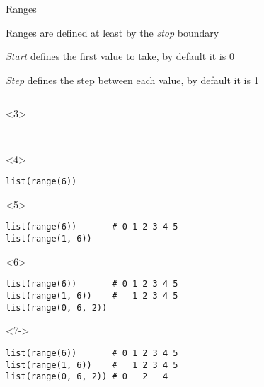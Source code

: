 \begin{frame}[fragile]{Ranges}

   Ranges are defined at least by the \textit{stop} boundary

   \textit{Start} defines the first value to take, by default it is 0

   \textit{Step} defines the step between each value, by default it is 1

  \medskip

  \begin{center}

  \begin{columns}[onlytextwidth]
    \begin{column}{\textwidth}

      \begin{onlyenv}<3>
        \begin{lstlisting}[style=python,morekeywords={for, in, range, list}]


 \end{lstlisting}
      \end{onlyenv}

      \begin{onlyenv}<4>
        \begin{lstlisting}[style=python,morekeywords={for, in, range, list}]
list(range(6))

 \end{lstlisting}
      \end{onlyenv}

      \begin{onlyenv}<5>
        \begin{lstlisting}[style=python,morekeywords={for, in, range, list}]
list(range(6))       # 0 1 2 3 4 5
list(range(1, 6))
  \end{lstlisting}
      \end{onlyenv}

      \begin{onlyenv}<6>
        \begin{lstlisting}[style=python,morekeywords={for, in, range, list}]
list(range(6))       # 0 1 2 3 4 5
list(range(1, 6))    #   1 2 3 4 5
list(range(0, 6, 2)) \end{lstlisting}
      \end{onlyenv}

      \begin{onlyenv}<7->
        \begin{lstlisting}[style=python,morekeywords={for, in, range, list}]
list(range(6))       # 0 1 2 3 4 5
list(range(1, 6))    #   1 2 3 4 5
list(range(0, 6, 2)) # 0   2   4 \end{lstlisting}
      \end{onlyenv}

    \end{column}
  \end{columns}

  \end{center}

\end{frame}


